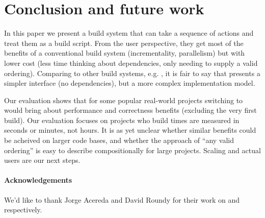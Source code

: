 \section{Conclusion and future work}
\label{sec:conclusion}

In this paper we present a build system that can take a sequence of actions and treat them as a build script. From the user perspective, they get most of the benefits of a conventional build system (incrementality, parallelism) but with lower cost (less time thinking about dependencies, only needing to supply a valid ordering). Comparing \Rattle to other build systems, e.g. \Make, it is fair to say that \Rattle presents a simpler interface (no dependencies), but a more complex implementation model.

Our evaluation shows that for some popular real-world projects switching to \Rattle would bring about performance and correctness benefits (excluding the very first build). Our evaluation focuses on projects who build times are measured in seconds or minutes, not hours. It is as yet unclear whether similar benefits could be acheived on larger code bases, and whether the \Rattle approach of ``any valid ordering'' is easy to describe compositionally for large projects. Scaling \Rattle and actual users are our next steps.

\paragraph{Acknowledgements} We'd like to thank Jorge Acereda and David Roundy for their work on \Fsatrace and \libbigbro respectively.

